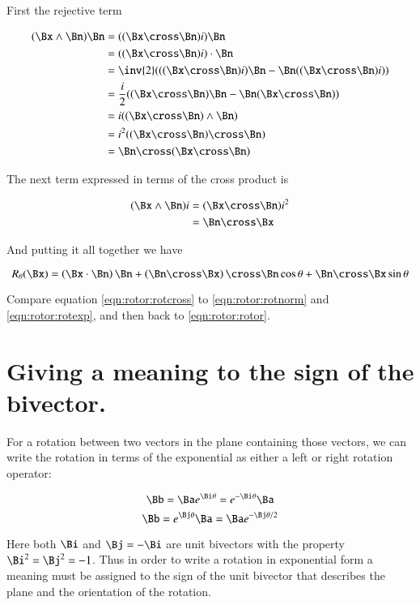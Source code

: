 First the rejective term

\begin{align*}
(\Bx \wedge \Bn) \Bn 
&= ((\Bx \cross \Bn) i) \Bn \\
&= ((\Bx \cross \Bn) i) \cdot \Bn \\
&= \inv{2} ( ((\Bx \cross \Bn) i) \Bn - \Bn ((\Bx \cross \Bn) i)) \\
&= \frac{i}{2} ( (\Bx \cross \Bn) \Bn - \Bn (\Bx \cross \Bn) ) \\
&= i ( (\Bx \cross \Bn) \wedge \Bn ) \\
&= i^2 ( (\Bx \cross \Bn) \cross \Bn ) \\
&= \Bn \cross (\Bx \cross \Bn) \\
\end{align*}

The next term expressed in terms of the cross product is

\begin{align*}
(\Bx \wedge \Bn) i
&=
(\Bx \cross \Bn) i^2 \\
&= \Bn \cross \Bx \\
\end{align*}

And putting it all together we have

\begin{equation}\label{eqn:rotor:rotcross}
R_\theta(\Bx) =
\left(\Bx \cdot \Bn\right) \Bn 
 + \left(\Bn \cross \Bx\right) \cross \Bn \cos\theta 
 + \Bn \cross \Bx \sin\theta 
\end{equation}

Compare equation \ref{eqn:rotor:rotcross} to \ref{eqn:rotor:rotnorm} and \ref{eqn:rotor:rotexp}, and then back to \ref{eqn:rotor:rotor}.

\section{Giving a meaning to the sign of the bivector. }

For a rotation between two vectors in the plane containing those vectors, we can write the rotation 
in terms of the exponential as either a left or right rotation operator:

\[
\Bb = \Ba e^{\Bi\theta} = e^{-\Bi\theta}\Ba 
\]
\[
\Bb = e^{\Bj\theta}\Ba = \Ba e^{-\Bj\theta/2}
\]

Here both $\Bi$ and $\Bj=-\Bi$ are unit bivectors with the property $\Bi^2 = \Bj^2 = -1$.
Thus in order to write a rotation in exponential form a meaning must be assigned to the sign of the unit bivector that describes the
plane and the orientation of the rotation.

